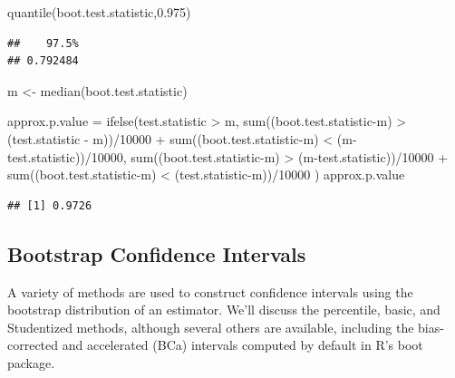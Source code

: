 \documentclass[
]{book}
\newenvironment{Shaded}{\begin{snugshade}}{\end{snugshade}}
\newcommand{\DecValTok}[1]{\textcolor[rgb]{0.00,0.00,0.81}{#1}}
\newcommand{\FloatTok}[1]{\textcolor[rgb]{0.00,0.00,0.81}{#1}}
\newcommand{\FunctionTok}[1]{\textcolor[rgb]{0.00,0.00,0.00}{#1}}
\newcommand{\NormalTok}[1]{#1}
\newcommand{\OtherTok}[1]{\textcolor[rgb]{0.56,0.35,0.01}{#1}}
\newcommand{\SpecialCharTok}[1]{\textcolor[rgb]{0.00,0.00,0.00}{#1}}
\begin{document}
\begin{Shaded}
\begin{Highlighting}[]
\FunctionTok{quantile}\NormalTok{(boot.test.statistic,}\FloatTok{0.975}\NormalTok{)}
\end{Highlighting}
\end{Shaded}

\begin{verbatim}
##    97.5% 
## 0.792484
\end{verbatim}

\begin{Shaded}
\begin{Highlighting}[]
\NormalTok{m }\OtherTok{\textless{}{-}} \FunctionTok{median}\NormalTok{(boot.test.statistic)}

\NormalTok{approx.p.value }\OtherTok{=} \FunctionTok{ifelse}\NormalTok{(test.statistic }\SpecialCharTok{\textgreater{}}\NormalTok{ m, }\FunctionTok{sum}\NormalTok{((boot.test.statistic}\SpecialCharTok{{-}}\NormalTok{m) }\SpecialCharTok{\textgreater{}}\NormalTok{ (test.statistic }\SpecialCharTok{{-}}\NormalTok{ m))}\SpecialCharTok{/}\DecValTok{10000} \SpecialCharTok{+} \FunctionTok{sum}\NormalTok{((boot.test.statistic}\SpecialCharTok{{-}}\NormalTok{m) }\SpecialCharTok{\textless{}}\NormalTok{ (m}\SpecialCharTok{{-}}\NormalTok{test.statistic))}\SpecialCharTok{/}\DecValTok{10000}\NormalTok{, }\FunctionTok{sum}\NormalTok{((boot.test.statistic}\SpecialCharTok{{-}}\NormalTok{m) }\SpecialCharTok{\textgreater{}}\NormalTok{ (m}\SpecialCharTok{{-}}\NormalTok{test.statistic))}\SpecialCharTok{/}\DecValTok{10000} \SpecialCharTok{+} \FunctionTok{sum}\NormalTok{((boot.test.statistic}\SpecialCharTok{{-}}\NormalTok{m) }\SpecialCharTok{\textless{}}\NormalTok{ (test.statistic}\SpecialCharTok{{-}}\NormalTok{m))}\SpecialCharTok{/}\DecValTok{10000}\NormalTok{ )}
\NormalTok{approx.p.value }
\end{Highlighting}
\end{Shaded}

\begin{verbatim}
## [1] 0.9726
\end{verbatim}

\hypertarget{bootstrap-confidence-intervals}{%
\subsection{Bootstrap Confidence Intervals}\label{bootstrap-confidence-intervals}}

A variety of methods are used to construct confidence intervals using the bootstrap distribution of an estimator. We'll discuss the percentile, basic, and Studentized methods, although several others are available, including the bias-corrected and accelerated (BCa) intervals computed by default in R's boot package.
\end{document}
